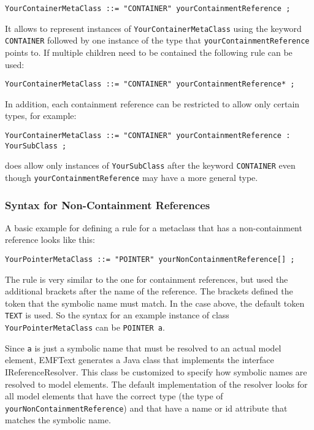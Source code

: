 \begin{lstlisting}
YourContainerMetaClass ::= "CONTAINER" yourContainmentReference ;
\end{lstlisting}

It allows to represent instances of \texttt{YourContainerMetaClass} using the
keyword \texttt{CONTAINER} followed by one instance of the type that
\texttt{yourContainmentReference} points to. If multiple children need to be
contained the following rule can be used:

\begin{lstlisting}
YourContainerMetaClass ::= "CONTAINER" yourContainmentReference* ;
\end{lstlisting}

In addition, each containment reference can be restricted to allow only certain 
types, for example:

\begin{lstlisting}
YourContainerMetaClass ::= "CONTAINER" yourContainmentReference : YourSubClass ;
\end{lstlisting}

does allow only instances of \texttt{YourSubClass} after the keyword
\texttt{CONTAINER} even though \texttt{yourContainmentReference} may have a more
general type.

\subsubsection{Syntax for Non-Containment References}

A basic example for defining a rule for a metaclass that has a non-containment 
reference looks like this:

\begin{lstlisting}
YourPointerMetaClass ::= "POINTER" yourNonContainmentReference[] ;
\end{lstlisting}

The rule is very similar to the one for containment references, but used the 
additional brackets after the name of the reference. The brackets defined the 
token that the symbolic name must match. In the case above, the default token
\texttt{TEXT} is used. So the syntax for an example instance of class
\texttt{YourPointerMetaClass} can be \texttt{POINTER a}.

Since \texttt{a} is just a symbolic name that must be resolved to an actual 
model element, EMFText generates a Java class that implements the interface 
IReferenceResolver. This class be customized to specify how symbolic names are
resolved to model elements. The default implementation of the resolver looks 
for all model elements that have the correct type (the type of
\texttt{yourNonContainmentReference}) and that have a
name or id attribute that matches the symbolic name.

